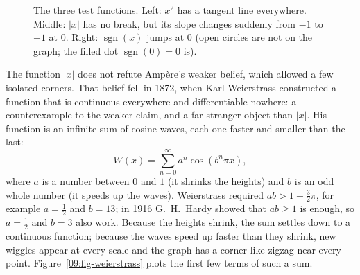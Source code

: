 \begin{figure}[htbp]
\caption{The three test functions. Left: $x^2$ has a tangent line everywhere. Middle: $|x|$ has no break, but its slope changes suddenly from $-1$ to $+1$ at $0$. Right: $\operatorname{sgn}(x)$ jumps at $0$ (open circles are not on the graph; the filled dot $\operatorname{sgn}(0) = 0$ is).}
\label{09:fig-three-graphs}
\end{figure}

The function $|x|$ does not refute Amp\`ere's weaker belief, which allowed a few isolated corners. That belief fell in 1872, when Karl Weierstrass constructed a function that is continuous everywhere and differentiable nowhere: a counterexample to the weaker claim, and a far stranger object than $|x|$. His function is an infinite sum of cosine waves, each one faster and smaller than the last:
\[
W(x) = \sum_{n=0}^{\infty} a^n \cos(b^n \pi x),
\]
where $a$ is a number between $0$ and $1$ (it shrinks the heights) and $b$ is an odd whole number (it speeds up the waves). Weierstrass required $ab > 1 + \tfrac{3}{2}\pi$, for example $a = \tfrac{1}{2}$ and $b = 13$; in 1916 G.~H.~Hardy showed that $ab \ge 1$ is enough, so $a = \tfrac{1}{2}$ and $b = 3$ also work. Because the heights shrink, the sum settles down to a continuous function; because the waves speed up faster than they shrink, new wiggles appear at every scale and the graph has a corner-like zigzag near every point. Figure~\ref{09:fig-weierstrass} plots the first few terms of such a sum.

